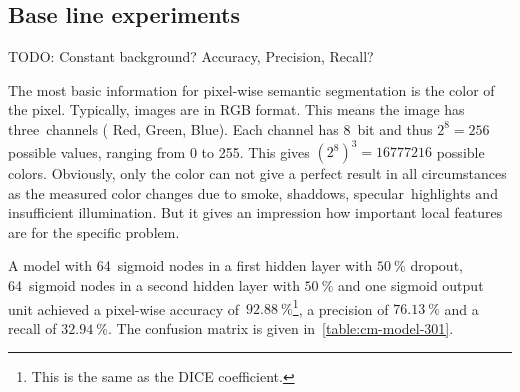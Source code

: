 
\subsection{Base line experiments}\label{sec:ap3}

TODO: Constant background? Accuracy, Precision, Recall?

The most basic information for pixel-wise semantic segmentation is the color of
the pixel. Typically, images are in RGB format. This means the image has
three~channels ({\color{red} R}ed, {\color{green} G}reen, {\color{blue} B}lue).
Each channel has 8~bit and thus $2^8 = 256$ possible values, ranging from 0 to
255. This gives ${(2^8)}^3 = \num{16777216}$ possible colors. Obviously, only
the color can not give a perfect result in all circumstances as the measured
color changes due to smoke, shaddows, specular~highlights and insufficient
illumination. But it gives an impression how important local features are for
the specific problem.

A model with 64~sigmoid nodes in a first hidden layer with $\SI{50}{\percent}$
dropout, 64~sigmoid nodes in a second hidden layer with $\SI{50}{\percent}$ and
one sigmoid output unit achieved a pixel-wise accuracy
of~$\SI{92.88}{\percent}$\footnote{This is the same as the DICE coefficient.},
a precision of $\SI{76.13}{\percent}$ and a recall of $\SI{32.94}{\percent}$.
The confusion matrix is given in~\cref{table:cm-model-301}.
